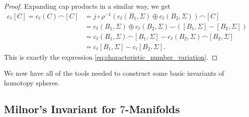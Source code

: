 \begin{proof}
	Expanding cap products in a similar way, we get
	\[
		\begin{aligned}
			c_\ell[C] = c_\ell(C)\frown [C]
			 & = j\circ\rho^{-1}(c_\ell(B_1,\Sigma)\oplus c_\ell(B_2,\Sigma))\frown [C]        \\
			 & = c_\ell(B_1,\Sigma)\oplus c_\ell(B_2,\Sigma)\smile([B_1, \Sigma]-[B_2,\Sigma]) \\
			 & = c_\ell(B_1,\Sigma)\frown [B_1,\Sigma] - c_\ell(B_2,\Sigma)\frown [B_2,\Sigma] \\
			 & = c_\ell[B_1,\Sigma] - c_\ell[B_2,\Sigma].
		\end{aligned}
	\]
	This is exactly the expression \cref{eq:characteristic_number_variation}.
\end{proof}

We now have all of the tools needed to construct some basic invariants of homotopy spheres.

\subsection*{Milnor's Invariant for $7$-Manifolds}

